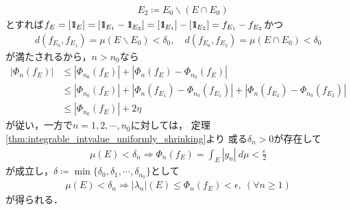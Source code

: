 \begin{prf}
\begin{description}
\begin{align}
					\quad E_2 \coloneqq E_0 \backslash (E \cap E_0)
				\end{align}
				とすれば$f_E = [\mbox{1}\hspace{-0.25em}\mbox{l}_E] = [\mbox{1}\hspace{-0.25em}\mbox{l}_{E_1} - \mbox{1}\hspace{-0.25em}\mbox{l}_{E_2}]
				= [\mbox{1}\hspace{-0.25em}\mbox{l}_{E_1}] - [\mbox{1}\hspace{-0.25em}\mbox{l}_{E_2}] = f_{E_1} - f_{E_2}$かつ
				\begin{align}
					d(f_{E_0},f_{E_1}) = \mu(E \backslash E_0) < \delta_0,
					\quad d(f_{E_0},f_{E_2}) = \mu(E \cap E_0) < \delta_0
				\end{align}
				が満たされるから，$n > n_0$なら
				\begin{align}
					\left|\Phi_n(f_E)\right| 
					&\leq \left|\Phi_{n_0}(f_E)\right| + \left|\Phi_n(f_E) - \Phi_{n_0}(f_E)\right| \\
					&\leq \left|\Phi_{n_0}(f_E)\right| + \left|\Phi_n(f_{E_1}) - \Phi_{n_0}(f_{E_1})\right|
						+ \left|\Phi_n(f_{E_2}) - \Phi_{n_0}(f_{E_2})\right| \\
					&\leq \left|\Phi_{n_0}(f_E)\right| + 2\eta
				\end{align}
				が従い，一方で$n=1,2,\cdots,n_0$に対しては，
				定理\ref{thm:integrable_intvalue_uniformly_shrinking}より
				或る$\delta_n > 0$が存在して
				\begin{align}
					\mu(E) < \delta_n \Longrightarrow \Phi_n(f_E) = \int_E |g_n|\ d\mu < \frac{\epsilon}{2}
				\end{align}
				が成立し，$\delta \coloneqq \min{}{\{\delta_0,\delta_1,\cdots,\delta_{n_0}\}}$として
				\begin{align}
					\mu(E) < \delta_n \Longrightarrow |\lambda_n|(E) \leq \Phi_n(f_E) < \epsilon,\ (\forall n \geq 1)
				\end{align}
				が得られる．
				

\end{description}
\end{prf}
